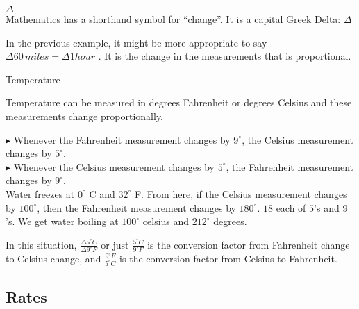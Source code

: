\documentclass{ximera}
\begin{document}
\begin{notation}  \textbf{\textcolor{red!80!black}{$\Delta$}} \\


Mathematics has a shorthand symbol for ``change''.  It is a capital Greek Delta: $\Delta$

\end{notation}

In the previous example, it might be more appropriate to say \textbf{\textcolor{purple!85!blue}{$\Delta 60 \, miles = \Delta 1 hour$}} . It is the change in the measurements that is proportional.




\begin{example} Temperature


Temperature can be measured in degrees Fahrenheit or degrees Celsius and these measurements change proportionally. 


$\blacktriangleright$ Whenever the Fahrenheit measurement changes by $9^{\circ}$, the Celsius measurement changes by $5^{\circ}$. \\
$\blacktriangleright$ Whenever the Celsius measurement changes by $5^{\circ}$, the Fahrenheit measurement changes by $9^{\circ}$. \\



Water freezes at $0^{\circ}$ C and $32^{\circ}$ F.  From here, if the Celsius measurement changes by $100^{\circ}$, then the Fahrenheit measurement changes by $180^{\circ}$.  $18$ each of $5$'s and $9$'s. We get water boiling at $100^{\circ}$ celsius and $212^{\circ}$ degrees.


In this situation, $\frac{\Delta 5^{\circ}C}{\Delta 9^{\circ}F}$ or just $\frac{5^{\circ}C}{9^{\circ}F}$ is the conversion factor from Fahrenheit change to Celsius change, and $\frac{9^{\circ}F}{5^{\circ}C}$ is the conversion factor from Celsius to Fahrenheit.






\end{example} 
















\subsection{Rates}
\end{document}
